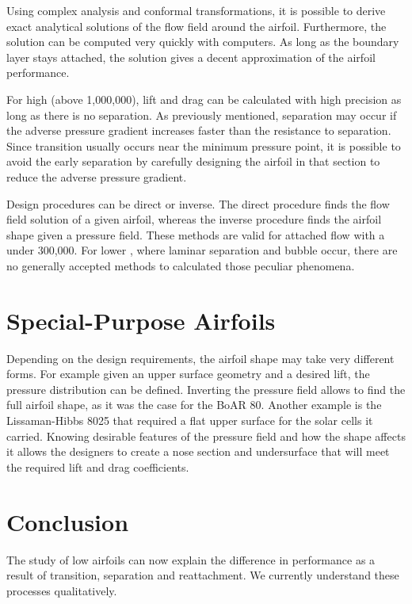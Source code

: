 \documentclass[letterpaper,12pt,]{article}
\begin{document}
Using complex analysis and conformal transformations, it is possible to derive exact analytical solutions of the flow field around the airfoil. Furthermore, the solution can be computed very quickly with computers. As long as the boundary layer stays attached, the solution gives a decent approximation of the airfoil performance. 

For high \rn (above 1,000,000), lift and drag can be calculated with high precision as long as there is no separation. As previously mentioned, separation may occur if the adverse pressure gradient increases faster than the resistance to separation. Since transition usually occurs near the minimum pressure point, it is possible to avoid the early separation by carefully designing the airfoil in that section to reduce the adverse pressure gradient.

Design procedures can be direct or inverse. The direct procedure finds the flow field solution of a given airfoil, whereas the inverse procedure finds the airfoil shape given a pressure field. These methods are valid for attached flow with a \rn under 300,000. For lower \rn, where laminar separation and bubble occur, there are no generally accepted methods to calculated those peculiar phenomena.

\section{Special-Purpose Airfoils}

Depending on the design requirements, the airfoil shape may take very different forms. For example given an upper surface geometry and a desired lift, the pressure distribution can be defined. Inverting the pressure field allows to find the full airfoil shape, as it was the case for the BoAR 80. Another example is the Lissaman-Hibbs 8025 that required a flat upper surface for the solar cells it carried. Knowing desirable features of the pressure field and how the shape affects it allows the designers to create a nose section and undersurface that will meet the required lift and drag coefficients.

\section{Conclusion}

The study of low \rn airfoils can now explain the difference in performance as a result of transition, separation and reattachment. We currently understand these processes qualitatively.

%
%
\end{document}
